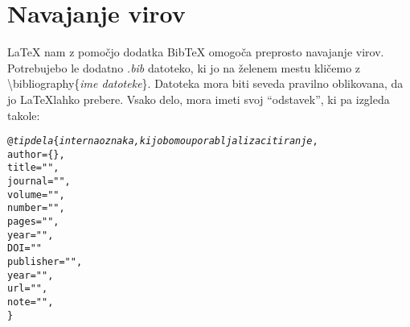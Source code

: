 \documentclass[a4paper]{book}
\newcommand\tbs{\textbackslash{}}
\begin{document}

\section{Navajanje virov}

\LaTeX{} nam z pomočjo dodatka Bib\TeX{} omogoča preprosto navajanje virov. Potrebujebo le dodatno \textit{.bib} datoteko, ki jo na želenem mestu kličemo z \tbs{}bibliography\{\textit{ime datoteke}\}. Datoteka mora biti seveda pravilno oblikovana, da jo \LaTeX lahko prebere.
Vsako delo, mora imeti svoj ``odstavek'', ki pa izgleda takole:

\begin{alltt}

@\textit{tip dela} \{ \textit{interna oznaka, ki jo bomo uporabljali za citiranje},
  author = \{\},
  title = "",
  journal = "",
  volume = "",
  number = "",
  pages = "",
  year = "",
  DOI = ""
  publisher = "",
  year = "",
  url = "",
  note = "",
\}

\end{alltt}


\end{document}
